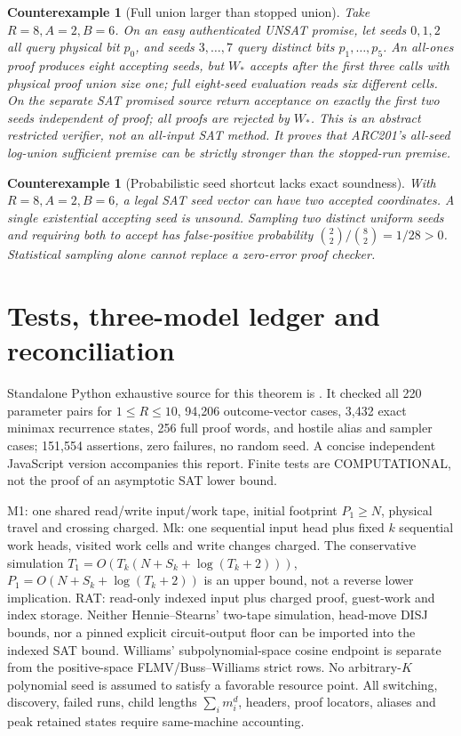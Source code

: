 \documentclass[11pt]{article}
\newtheorem{counterexample}[theorem]{Counterexample}
\begin{document}
\begin{counterexample}[Full union larger than stopped union]
Take $R=8,A=2,B=6$. On an easy authenticated UNSAT promise, let seeds $0,1,2$ all query physical bit $p_0$, and seeds $3,\ldots,7$ query distinct bits $p_1,\ldots,p_5$. An all-ones proof produces eight accepting seeds, but $W_*$ accepts after the first three calls with physical proof union size one; full eight-seed evaluation reads six different cells. On the separate SAT promised source return acceptance on exactly the first two seeds independent of proof; all proofs are rejected by $W_*$. This is an \emph{abstract restricted verifier}, not an all-input SAT method. It proves that ARC201's all-seed log-union sufficient premise can be strictly stronger than the stopped-run premise.
\end{counterexample}
\begin{counterexample}[Probabilistic seed shortcut lacks exact soundness]
With $R=8,A=2,B=6$, a legal SAT seed vector can have two accepted coordinates. A single existential accepting seed is unsound. Sampling two distinct uniform seeds and requiring both to accept has false-positive probability $\binom22/\binom82=1/28>0$. Statistical sampling alone cannot replace a zero-error proof checker.
\end{counterexample}

\section{Tests, three-model ledger and reconciliation}
Standalone Python exhaustive source for this theorem is . It checked all 220 parameter pairs for $1\le R\le10$, 94,206 outcome-vector cases, 3,432 exact minimax recurrence states, 256 full proof words, and hostile alias and sampler cases; 151,554 assertions, zero failures, no random seed. A concise independent JavaScript version accompanies this report. Finite tests are COMPUTATIONAL, not the proof of an asymptotic SAT lower bound.

M1: one shared read/write input/work tape, initial footprint $P_1\ge N$, physical travel and crossing charged. Mk: one sequential input head plus fixed $k$ sequential work heads, visited work cells and write changes charged. The conservative simulation $T_1=O(T_k(N+S_k+\log(T_k+2)))$, $P_1=O(N+S_k+\log(T_k+2))$ is an upper bound, not a reverse lower implication. RAT: read-only indexed input plus charged proof, guest-work and index storage. Neither Hennie--Stearns' two-tape simulation, head-move DISJ bounds, nor a pinned explicit circuit-output floor can be imported into the indexed SAT bound. Williams' subpolynomial-space cosine endpoint is separate from the positive-space FLMV/Buss--Williams strict rows. No arbitrary-$K$ polynomial seed is assumed to satisfy a favorable resource point. All switching, discovery, failed runs, child lengths $\sum_i m_i^d$, headers, proof locators, aliases and peak retained states require same-machine accounting.
\end{document}
